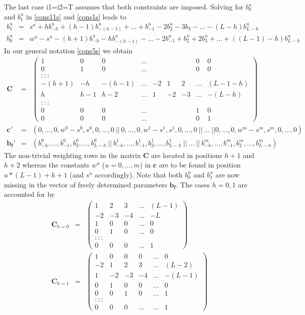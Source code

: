\documentclass[11pt]{article}
\begin{document}
The last case i1=i2=T assumes that both constraints are imposed. Solving for $b_0^u$ and $b_1^u$ in \ref{cons11s} and \ref{cons1s} leads to
\begin{eqnarray*}%
b_{1}^u&=&s^u+hb_{-h}^u+(h-1)b_{-(h-1)}^u+...+b_{-1}^u-2b_{2}^u-3b_{3}-...-(L-h)b_{L-h}^u\\
b_{0}^u&=&w^u-s^u-(h+1)b_{-h}^u-hb_{-(h-1)}^u-...-2b_{-1}^u+b_{2}^u+2b_3^u+...+((L-1)-h)b_{L-h}^u%
\end{eqnarray*}
In our general notation  \ref{cons5s}  we obtain
\begin{eqnarray}\label{cons77s}
\mathbf{C}&=&\left(\begin{array}{ccccccccc}
1&0&0&...&&&&0&0\\
0&1&0&...&&&&0&0\\
:::\\
-(h+1)&-h&-(h-1)&...&-2&1&2&...&(L-1-h)\\
h&h-1&h-2&...&1&-2&-3&...&-(L-h)\\
:::\\
0&0&0&...&&&&1&0\\
0&0&0&...&&&&0&1
\end{array}\right)\\
\mathbf{c}'&=&(0,...,0,w^0-s^0,s^0,0,...,0~||~0,...,0,w^1-s^1,s^1,0,...,0~||~...~||0,...,0,w^m-s^m,s^m,0,...,0)\nonumber\\
\mathbf{b_f}'&=&(b_{-h}^0,...,b_{-1}^0,b_2^0,...,b_{L-h}^0~||~b_{-h}^1,...,b_{-1}^1,b_2^1,...,b_{L-h}^1~||~...~||~b_{-h}^m,...,b_{-1}^m,b_2^m,...,b_{L-h}^m)\nonumber
\end{eqnarray}
The non-trivial weighting rows in the matrix $\mathbf{C}$ are located in positions $h+1$ and $h+2$ whereas the constants $w^u$ ($u=0,...,m$) in $\mathbf{c}$ are to be found in position $u*(L-1)+h+1$ (and $s^u$ accordingly). Note that both $b_0^u$ and $b_1^u$ are now missing in the vector of freely determined parameters $\mathbf{b_f}$. The cases $h=0,1$ are accounted for by 
\begin{eqnarray*}%
\mathbf{C}_{h=0}&=&\left(\begin{array}{ccccc}
1&2&3&...&(L-1)\\
-2&-3&-4&...&-L\\
1&0&0&...&0\\
0&1&0&...&0\\
:::\\
0&0&0&...&1
\end{array}\right)\nonumber\\
\mathbf{C}_{h=1}&=&\left(\begin{array}{cccccc}
1&0&0&0&...&0\\
-2&1&2&3&...&(L-2)\\
1&-2&-3&-4&...&-(L-1)\\
0&1&0&0&...&0\\
0&0&1&0&...&1\\
:::\\
0&0&0&...&...&1
\end{array}\right)\nonumber
\end{eqnarray*}
\end{document}
